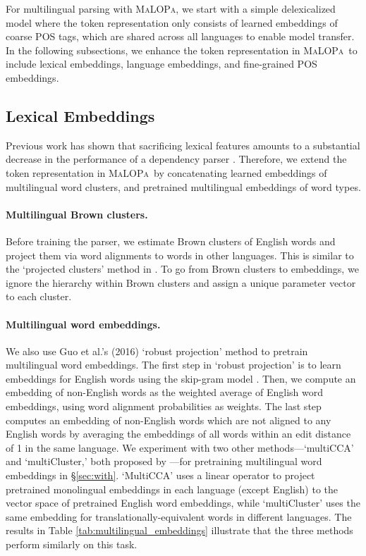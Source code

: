 \documentclass[11pt]{article}
\newcommand{\malopa}{\textsc{MaLOPa}}
\begin{document}
For multilingual parsing with \malopa, we start with a simple delexicalized model where the token representation only consists of learned embeddings of coarse POS tags, which are shared across all languages to enable model transfer.
In the following subsections, we enhance the token representation in \malopa~to include lexical embeddings, language embeddings, and fine-grained POS embeddings.

\subsection{Lexical Embeddings}
\label{sec:embeddings}

Previous work has shown that sacrificing lexical features amounts to a substantial decrease in the performance of a dependency parser \cite{cohen:11,tackstrom:12,tiedemann:15,guo:15}.  
Therefore, we extend the token representation in \malopa~by concatenating learned embeddings of multilingual word clusters, and pretrained multilingual embeddings of word types.

\paragraph{Multilingual Brown clusters.} Before training the parser, we estimate Brown clusters of English words and project them via word alignments to words in other languages. This is similar to the `projected clusters' method in .
To go from Brown clusters to embeddings, we ignore the hierarchy within Brown clusters and assign a unique parameter vector to each cluster.

\paragraph{Multilingual word embeddings.} We also use Guo et al.'s (2016) \nocite{guo:16} `robust projection' method to pretrain multilingual word embeddings.
The first step in `robust projection' is to learn embeddings for English words using the skip-gram model \cite{mikolov:13}.
Then, we compute an embedding of non-English words as the weighted average of English word embeddings, using word alignment probabilities as weights.
The last step computes an embedding of non-English words which are not aligned to any English words by averaging the embeddings of all words within an edit distance of 1 in the same language.
We experiment with two other methods---`multiCCA' and `multiCluster,' both proposed by ---for pretraining multilingual word embeddings in \S\ref{sec:with}.
`MultiCCA' uses a linear operator to project pretrained monolingual embeddings in each language (except English) to the vector space of pretrained English word embeddings, while `multiCluster' uses the same embedding for translationally-equivalent words in different languages.
The results in Table \ref{tab:multilingual_embeddings} illustrate that the three methods perform similarly on this task.
\end{document}
